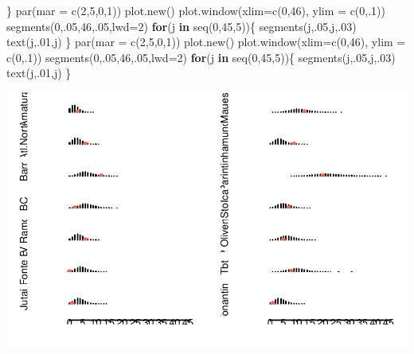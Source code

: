 \documentclass[
  letterpaper,
  DIV=11,
  numbers=noendperiod]{scrreprt}
\newenvironment{Shaded}{\begin{snugshade}}{\end{snugshade}}
\newcommand{\AttributeTok}[1]{\textcolor[rgb]{0.40,0.45,0.13}{#1}}
\newcommand{\ControlFlowTok}[1]{\textcolor[rgb]{0.00,0.23,0.31}{\textbf{#1}}}
\newcommand{\DecValTok}[1]{\textcolor[rgb]{0.68,0.00,0.00}{#1}}
\newcommand{\FunctionTok}[1]{\textcolor[rgb]{0.28,0.35,0.67}{#1}}
\newcommand{\NormalTok}[1]{\textcolor[rgb]{0.00,0.23,0.31}{#1}}
\theoremstyle{definition}
\theoremstyle{definition}
\theoremstyle{plain}
\theoremstyle{remark}
\begin{document}
\begin{Shaded}
\begin{Highlighting}[]
\NormalTok{\}}
  \FunctionTok{par}\NormalTok{(}\AttributeTok{mar =} \FunctionTok{c}\NormalTok{(}\DecValTok{2}\NormalTok{,}\DecValTok{5}\NormalTok{,}\DecValTok{0}\NormalTok{,}\DecValTok{1}\NormalTok{))}
  \FunctionTok{plot.new}\NormalTok{()}
  \FunctionTok{plot.window}\NormalTok{(}\AttributeTok{xlim=}\FunctionTok{c}\NormalTok{(}\DecValTok{0}\NormalTok{,}\DecValTok{46}\NormalTok{), }\AttributeTok{ylim =} \FunctionTok{c}\NormalTok{(}\DecValTok{0}\NormalTok{,.}\DecValTok{1}\NormalTok{))}
  \FunctionTok{segments}\NormalTok{(}\DecValTok{0}\NormalTok{,.}\DecValTok{05}\NormalTok{,}\DecValTok{46}\NormalTok{,.}\DecValTok{05}\NormalTok{,}\AttributeTok{lwd=}\DecValTok{2}\NormalTok{)}
 \ControlFlowTok{for}\NormalTok{(j }\ControlFlowTok{in} \FunctionTok{seq}\NormalTok{(}\DecValTok{0}\NormalTok{,}\DecValTok{45}\NormalTok{,}\DecValTok{5}\NormalTok{))\{}
    \FunctionTok{segments}\NormalTok{(j,.}\DecValTok{05}\NormalTok{,j,.}\DecValTok{03}\NormalTok{)}
    \FunctionTok{text}\NormalTok{(j,.}\DecValTok{01}\NormalTok{,j)}
\NormalTok{  \}}
    \FunctionTok{par}\NormalTok{(}\AttributeTok{mar =} \FunctionTok{c}\NormalTok{(}\DecValTok{2}\NormalTok{,}\DecValTok{5}\NormalTok{,}\DecValTok{0}\NormalTok{,}\DecValTok{1}\NormalTok{))}
  \FunctionTok{plot.new}\NormalTok{()}
  \FunctionTok{plot.window}\NormalTok{(}\AttributeTok{xlim=}\FunctionTok{c}\NormalTok{(}\DecValTok{0}\NormalTok{,}\DecValTok{46}\NormalTok{), }\AttributeTok{ylim =} \FunctionTok{c}\NormalTok{(}\DecValTok{0}\NormalTok{,.}\DecValTok{1}\NormalTok{))}
  \FunctionTok{segments}\NormalTok{(}\DecValTok{0}\NormalTok{,.}\DecValTok{05}\NormalTok{,}\DecValTok{46}\NormalTok{,.}\DecValTok{05}\NormalTok{,}\AttributeTok{lwd=}\DecValTok{2}\NormalTok{)}
  \ControlFlowTok{for}\NormalTok{(j }\ControlFlowTok{in} \FunctionTok{seq}\NormalTok{(}\DecValTok{0}\NormalTok{,}\DecValTok{45}\NormalTok{,}\DecValTok{5}\NormalTok{))\{}
    \FunctionTok{segments}\NormalTok{(j,.}\DecValTok{05}\NormalTok{,j,.}\DecValTok{03}\NormalTok{)}
    \FunctionTok{text}\NormalTok{(j,.}\DecValTok{01}\NormalTok{,j)}
\NormalTok{  \}}
\end{Highlighting}
\end{Shaded}

\includegraphics{poisson_files/figure-pdf/unnamed-chunk-4-1.pdf}
\end{document}
